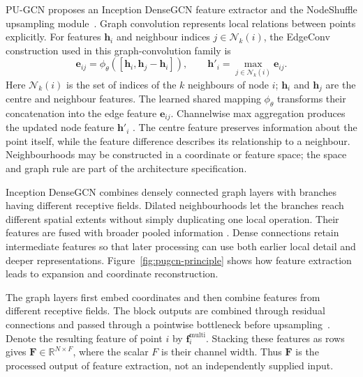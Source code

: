 PU-GCN proposes an Inception DenseGCN feature extractor and the NodeShuffle
upsampling module~\cite{qian2021pugcn}. Graph convolution represents local
relations between points explicitly. For features $\mathbf h_i$ and
neighbour indices $j\in\mathcal N_k(i)$, the EdgeConv construction used
in this graph-convolution family is
\begin{equation}
 \mathbf e_{ij}=\phi_\theta([\mathbf h_i,\mathbf h_j-\mathbf h_i]),
 \qquad\mathbf h'_i=\max_{j\in\mathcal N_k(i)}\mathbf e_{ij}.
 \label{eq:edge_feature}
\end{equation}
Here $\mathcal N_k(i)$ is the set of indices of the $k$ neighbours of
node $i$; $\mathbf h_i$ and $\mathbf h_j$ are the centre and neighbour
features. The learned shared mapping $\phi_\theta$ transforms their
concatenation into the edge feature $\mathbf e_{ij}$. Channelwise max
aggregation produces the updated node feature $\mathbf h'_i$
\cite{wang2019dgcnn}.
The centre feature preserves information about the point itself, while
the feature difference describes its relationship to a neighbour.
Neighbourhoods may be constructed in a coordinate or feature space; the
space and graph rule are part of the architecture specification.

Inception DenseGCN combines densely connected graph layers with branches
having different receptive fields. Dilated neighbourhoods let the branches
reach different spatial extents without simply duplicating one local
operation. Their features are fused with broader pooled information
\cite{qian2021pugcn}. Dense connections retain intermediate features
so that later processing can use both earlier local detail and deeper
representations. Figure~\ref{fig:pugcn-principle} shows how feature
extraction leads to expansion and coordinate reconstruction.

The graph layers first embed coordinates and then combine features from
different receptive fields. The block outputs are combined through
residual connections and passed through a pointwise bottleneck before
upsampling~\cite{qian2021pugcn}. Denote the resulting feature of point $i$
by $\mathbf f_i^{\mathrm{multi}}$. Stacking these features as rows gives
$\mathbf F\in\mathbb R^{N\times F}$, where the scalar $F$ is their channel
width. Thus $\mathbf F$ is the processed output of feature extraction,
not an independently supplied input.

